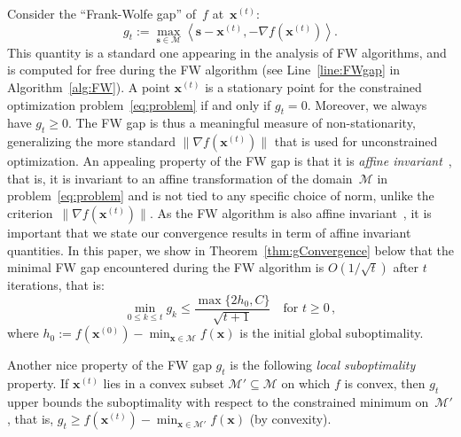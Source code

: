 \documentclass{article}
\newcommand{\prodscal}[2]{\left\langle#1,#2\right\rangle}
\newcommand{\x}{\bm{x}}
\newcommand{\s}{\bm{s}}
\newcommand{\xt}{\bm{x}^{(t)}}
\newcommand{\domain}{\mathcal{M}} %
\newcommand{\0}{\mathbf{0}} %
\begin{document}
Consider the ``Frank-Wolfe gap'' of~$f$ at~$\xt$:
\begin{equation} \label{eq:FWgap}
g_t := \max_{\s \in \domain} \prodscal{\s-\xt}{-\nabla f(\x^{(t)})} .
\end{equation}
This quantity is a standard one appearing in the analysis of FW algorithms, and is computed for free during the FW algorithm (see Line~\ref{line:FWgap} in Algorithm~\ref{alg:FW}).
A point $\xt$ is a stationary point for the constrained optimization problem~\eqref{eq:problem} if and only if $g_t = 0$. Moreover, we always have $g_t \geq 0$. The FW gap is thus a meaningful measure of non-stationarity, generalizing the more standard $\| \nabla f(\xt) \|$ that is used for unconstrained optimization. An appealing property of the FW gap is that it is \emph{affine invariant}~\citep{jaggi2013revisiting}, that is, it is invariant to an affine transformation of the domain~$\domain$ in problem~\eqref{eq:problem} and is not tied to any specific choice of norm, unlike the criterion~$\| \nabla f(\xt) \|$. As the FW algorithm is also affine invariant~\citep{jaggi2013revisiting}, it is important that we state our convergence results in term of affine invariant quantities. In this paper, we show in Theorem~\ref{thm:gConvergence} below that the minimal FW gap encountered during the FW algorithm is $O(1/\sqrt{t})$ after $t$ iterations, that is:
\begin{equation}
\min_{0 \leq k \leq t} g_k  \leq \frac{\max\{2 h_0, C\} }{\sqrt{t+1}}  \quad \text{for $t \geq 0$} \, ,
\end{equation}
where $h_0 := f(\x^{(0)}) - \min_{\x \in \domain} f(\x)$ is the initial global suboptimality.

Another nice property of the FW gap $g_t$ is the following \emph{local suboptimality} property. If $\xt$ lies in a convex subset $\domain' \subseteq \domain$ on which $f$ is convex, then $g_t$ upper bounds the suboptimality with respect to the constrained minimum on~$\domain'$, that is, $g_t \geq f(\xt) - \min_{\x \in \domain'} f(\x)$ (by convexity).
\end{document}
